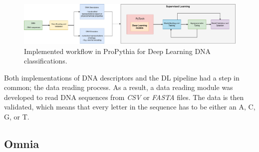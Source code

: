 \begin{figure}[htbp]
    \centering
    \includegraphics[width=\linewidth]{Chapters/Figures/meu}
    \caption{Implemented workflow in ProPythia for Deep Learning DNA classifications.}
    \label{fig:meu}
\end{figure}

Both implementations of \gls{DNA} descriptors and the \gls{DL} pipeline had a step in common; the data reading process. As a result, a data reading module was developed to read \gls{DNA} sequences from \textit{CSV} or \textit{FASTA} files. The data is then validated, which means that every letter in the sequence has to be either an \gls{A}, \gls{C}, \gls{G}, or \gls{T}.

\subsection{Omnia}





